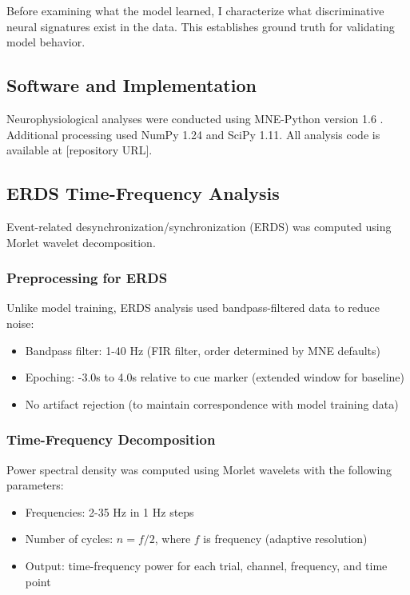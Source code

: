 Before examining what the model learned, I characterize what discriminative neural signatures exist in the data. This establishes ground truth for validating model behavior.


\subsection{Software and Implementation}
\label{subsec:methods_software}

Neurophysiological analyses were conducted using MNE-Python version 1.6 \cite{gramfort2013mne}. Additional processing used NumPy 1.24 and SciPy 1.11. All analysis code is available at [repository URL].


\subsection{ERDS Time-Frequency Analysis}
\label{subsec:methods_erds}

Event-related desynchronization/synchronization (ERDS) was computed using Morlet wavelet decomposition.

\subsubsection{Preprocessing for ERDS}

Unlike model training, ERDS analysis used bandpass-filtered data to reduce noise:

\begin{itemize}
    \item Bandpass filter: 1-40 Hz (FIR filter, order determined by MNE defaults)
    \item Epoching: -3.0s to 4.0s relative to cue marker (extended window for baseline)
    \item No artifact rejection (to maintain correspondence with model training data)
\end{itemize}

\subsubsection{Time-Frequency Decomposition}

Power spectral density was computed using Morlet wavelets with the following parameters:

\begin{itemize}
    \item Frequencies: 2-35 Hz in 1 Hz steps
    \item Number of cycles: $n = f / 2$, where $f$ is frequency (adaptive resolution)
    \item Output: time-frequency power for each trial, channel, frequency, and time point
\end{itemize}


